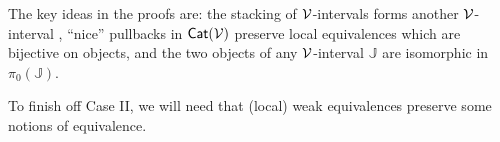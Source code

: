 \documentclass[a4paper,10pt
,draft
]{article}%
\newcommand{\J}{\mathbb J}
\renewcommand{\1}{\eta}%
\begin{document}

The key ideas in the proofs are:
the stacking of $\mathcal V$-intervals forms another $\mathcal V$-interval ,
``nice'' pullbacks in $\mathsf{Cat}(\mathcal V)$ preserve local equivalences which are bijective on objects, and
the two objects of any $\mathcal V$-interval $\mathbb J$ are isomorphic in $\pi_0(\mathbb J)$.

To finish off Case II, we will need that (local) weak equivalences preserve some notions of equivalence.
\end{document}
